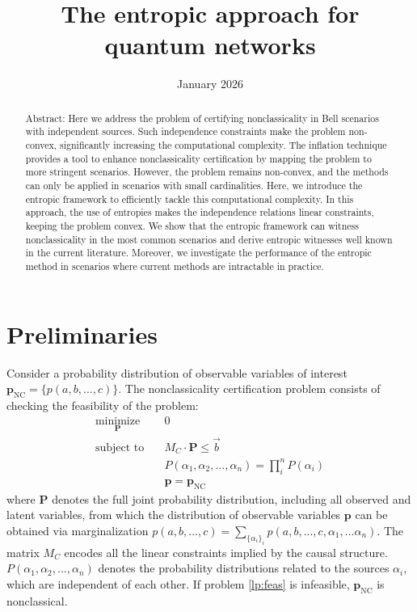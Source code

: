 \documentclass[reprint,pra, twocolumn, amsmath,amssymb,
 aps,superscriptaddress,]{revtex4-2}
\date{January 2026}
\begin{document}
\title{The entropic approach for quantum networks}

\author{}
\email{}
\affiliation{}

\begin{abstract}

Abstract: Here we address the problem of certifying nonclassicality in Bell scenarios with independent sources. Such independence constraints make the problem non-convex, significantly increasing the computational complexity. The inflation technique provides a tool to enhance nonclassicality certification by mapping the problem to more stringent scenarios. However, the problem remains non-convex, and the methods can only be applied in scenarios with small cardinalities. Here, we introduce the entropic framework to efficiently tackle this computational complexity. In this approach, the use of entropies makes the independence relations linear constraints, keeping the problem convex. We show that the entropic framework can witness nonclassicality in the most common scenarios and derive entropic witnesses well known in the current literature. Moreover, we investigate the performance of the entropic method in scenarios where current methods are intractable in practice.
    
\end{abstract}
\maketitle
\onecolumngrid

\section{Preliminaries}

Consider a probability distribution of observable variables of interest $\mathbf{p}_{\text{NC}} = \{p(a,b,...,c)\}$. The nonclassicality certification problem consists of checking the feasibility of the problem:
%
\begin{align}\label{lp:feas}
    \underset{\mathbf{P}}{\text{minimize}} &\quad  0 \nonumber\\
    \text{subject to}&\quad M_C\cdot\mathbf{P}\le \vec{b}\\
    &\quad P(\alpha_1 , \alpha_2, ..., \alpha_n) =\prod_i^n P(\alpha_i) \nonumber\\
    & \quad \mathbf{p} = \mathbf{p}_{\text{NC}}\nonumber
\end{align}
%
where $\mathbf{P}$ denotes the full joint probability distribution, including all observed and latent variables, from which the distribution of observable variables $\mathbf{p}$ can be obtained via marginalization $p(a,b,...,c) = \sum_{\{\alpha_i\}_i} p(a,b,...,c, \alpha_1, ...\alpha_n)$. The matrix $M_C$ encodes all the linear constraints implied by the causal structure. $P(\alpha_1 , \alpha_2, ..., \alpha_n)$ denotes the probability distributions related to the sources $\alpha_i$, which are independent of each other. If problem \eqref{lp:feas} is infeasible, $\mathbf{p}_{\text{NC}}$ is nonclassical.
\end{document}
